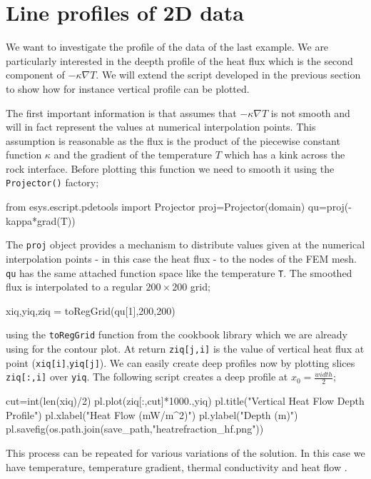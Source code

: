\section{Line profiles of 2D data}

We want to investigate the profile of the data of the last example. 
We are particularly interested in the deepth profile of the heat flux which is
the second component of $-\kappa \nabla T$. We will extend the script developed in the 
previous section to show how for instance vertical profile can be plotted.

The first important information is that \esc assumes that $-\kappa \nabla T$ is not smooth and
will in fact represent the values at numerical interpolation points. This assumption is reasonable as
the flux is the product of the piecewise constant function $\kappa$ and 
the gradient of the temperature $T$ which has a kink across the rock interface. 
Before plotting this function we need to smooth it using the 
\verb|Projector()| factory;
\begin{python}
from esys.escript.pdetools import Projector
proj=Projector(domain)
qu=proj(-kappa*grad(T))
\end{python}
The \verb|proj| object provides a mechanism to distribute values given at the numerical interpolation points
- in this case the heat flux - to the nodes of the FEM mesh. \verb|qu| has the same attached function space
like the temperature \verb|T|. The smoothed flux is interpolated 
to a regular $200\times 200$ grid;
\begin{python}
xiq,yiq,ziq = toRegGrid(qu[1],200,200)
\end{python}
using the \verb|toRegGrid| function from the cookbook library which we are already using for the contour plot.
At return \verb|ziq[j,i]| is the value of vertical heat flux at point 
(\verb|xiq[i]|,\verb|yiq[j]|). We can easily create deep profiles now by
plotting slices \verb|ziq[:,i]| over \verb|yiq|. The following script
creates a deep profile at $x_{0}=\frac{width}{2}$;
\begin{python}
cut=int(len(xiq)/2)
pl.plot(ziq[:,cut]*1000.,yiq)
pl.title("Vertical Heat Flow Depth Profile")
pl.xlabel("Heat Flow (mW/m^2)")
pl.ylabel("Depth (m)")
pl.savefig(os.path.join(save_path,"heatrefraction_hf.png"))
\end{python}
This process can be repeated for various variations of the solution. In this case we have temperature, temperature gradient, thermal conductivity and heat flow .


